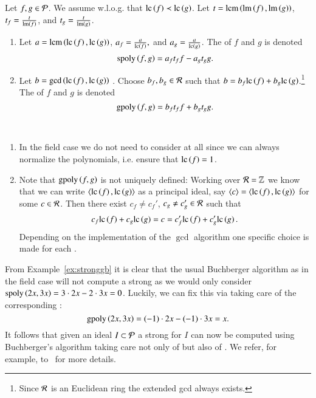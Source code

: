 \begin{definition}
\label{def:spoly}
Let $f,g \in \mathcal{P}$. We assume w.l.o.g. that $\mathrm{lc}\left({f}\right) \prec \mathrm{lc}\left({g}\right)$.
Let $t = \operatorname{lcm}\left(\operatorname{lm}\left({f}\right), \operatorname{lm}\left({g}\right)\right)$, $t_f = \frac{t}{\operatorname{lm}\left({f}\right)}$, and $t_g = \frac{t}{\operatorname{lm}\left({g}\right)}$.
\begin{enumerate}
\item Let $a = \operatorname{lcm}\left(\mathrm{lc}\left({f}\right), \mathrm{lc}\left({g}\right)\right)$, $a_f = \frac{a}{\mathrm{lc}\left({f}\right)},$ and $a_g =
\frac{a}{\mathrm{lc}\left({g}\right)}$. The \emph{\spt} of $f$ and $g$ is denoted 
\[\mathrm{spoly}\left({f},{g}\right) = a_f t_f f - a_g t_g g.\]
\item Let $b = \gcd\left(\mathrm{lc}\left({f}\right), \mathrm{lc}\left({g}\right)\right)$ . Choose $b_f, b_g \in \mathcal{R}$ such that $b = b_f \mathrm{lc}\left({f}\right) + b_g \mathrm{lc}\left({g}\right)$.\footnote{Since $\mathcal{R}$ is an Euclidean ring the extended gcd always exists.}
The \emph{\gpt} of $f$ and $g$ is denoted 
\[\mathrm{gpoly}\left({f},{g}\right) = b_f t_f f + b_g t_g g.\]
\end{enumerate}
\end{definition}

\begin{remark} \
\label{rem:gpairs}
\begin{enumerate}
\item In the field case we do not need to consider \gpts at all since we can
always normalize the polynomials, i.e. ensure that $\mathrm{lc}\left({f}\right) = 1$.
\item Note that $\mathrm{gpoly}\left({f},{g}\right)$ is not uniquely defined: Working over $\mathcal{R} = \mathbb{Z}$ we
know that we can write $\langle \mathrm{lc}\left({f}\right), \mathrm{lc}\left({g}\right) \rangle$ as a principal ideal, say
$\langle c \rangle = \langle \mathrm{lc}\left({f}\right), \mathrm{lc}\left({g}\right) \rangle$ for some $c\in\mathcal{R}$. Then
there exist $c_f \neq c_f'$, $c_g \neq c_g' \in \mathcal{R}$ such that
\[c_f \mathrm{lc}\left({f}\right) + c_g \mathrm{lc}\left({g}\right) = c = c_f' \mathrm{lc}\left({f}\right) + c_g' \mathrm{lc}\left({g}\right).\]
Depending on the implementation of the $\gcd$ algorithm one specific choice is
made for each \gpt.
\end{enumerate}
\end{remark}

From Example~\ref{ex:stronggb} it is clear that the usual Buchberger
algorithm as in the field case will not compute a strong \stb as we would only
consider $\mathrm{spoly}\left({2x},{3x}\right) = 3 \cdot 2x - 2 \cdot 3x = 0$. Luckily, we
can fix this via taking care of the corresponding \gpt:
\[\mathrm{gpoly}\left({2x},{3x}\right) = (-1) \cdot 2x - (-1) \cdot 3x = x.\]
It follows that given an ideal $I \subset \mathcal{P}$ a strong \stb for $I$ can now be computed using
Buchberger's algorithm taking care not only of \spts but also of \gpts. We refer,
for example,  to~\cite{lichtblau2012} for more details.

